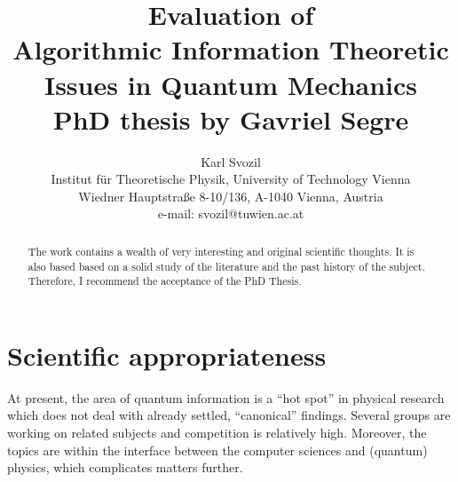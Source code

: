 \RequirePackage{graphicx}
\RequirePackage{courier}
\RequirePackage{mathptm}
\RequirePackage{bookman}
\renewcommand{\baselinestretch}{1.1}





\title{Evaluation of\\
Algorithmic Information Theoretic Issues in Quantum Mechanics\\
PhD thesis by Gavriel Segre}
\author{Karl Svozil\\
 {\small Institut f\"ur Theoretische Physik, University of Technology Vienna }     \\
  {\small Wiedner Hauptstra\ss e 8-10/136,}
  {\small A-1040 Vienna, Austria   }            \\
  {\small e-mail: svozil@tuwien.ac.at}}
\date{ }
\maketitle


\begin{abstract}
The work contains a wealth of very interesting and original scientific thoughts.
It is also based based on a solid study of the literature and the past history of the subject.
Therefore, I recommend the acceptance of the PhD Thesis.
\end{abstract}

\section{Scientific appropriateness}

At present, the area of quantum information is a ``hot spot'' in physical research
which does not deal with already settled, ``canonical'' findings.
Several groups are working on related subjects and competition is relatively high.
Moreover, the topics are within the interface between the computer sciences and
(quantum) physics, which complicates matters further.

